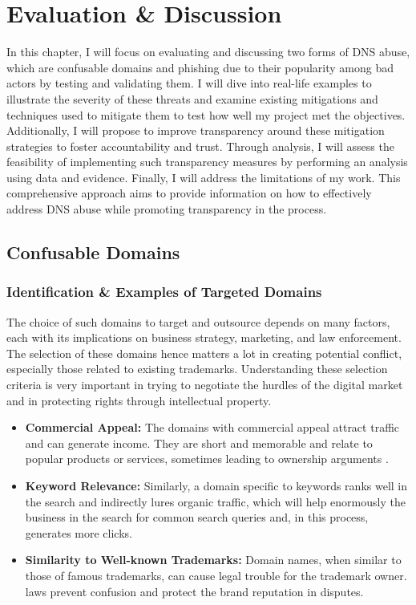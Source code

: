 \chapter{Evaluation \& Discussion}

In this chapter, I will focus on evaluating and discussing two forms of DNS abuse, which are confusable domains and phishing due to their popularity among bad actors by testing and validating them. I will dive into real-life examples to illustrate the severity of these threats and examine existing mitigations and techniques used to mitigate them to test how well my project met the objectives. Additionally, I will propose to improve transparency around these mitigation strategies to foster accountability and trust. Through analysis, I will assess the feasibility of implementing such transparency measures by performing an analysis using data and evidence. Finally, I will address the limitations of my work. This comprehensive approach aims to provide information on how to effectively address DNS abuse while promoting transparency in the process. 


\section{Confusable Domains}
\subsection{Identification \& Examples of Targeted Domains}

The choice of such domains to target and outsource depends on many factors, each with its implications on business strategy, marketing, and law enforcement. The selection of these domains hence matters a lot in creating potential conflict, especially those related to existing trademarks. Understanding these selection criteria is very important in trying to negotiate the hurdles of the digital market and in protecting rights through intellectual property.

\begin{itemize}
  \item \textbf{Commercial Appeal:} The domains with commercial appeal attract traffic and can generate income. They are short and memorable and relate to popular products or services, sometimes leading to ownership arguments \cite{Li2002ConflictDomainTrademark}.
  
  \item \textbf{Keyword Relevance:} Similarly, a domain specific to keywords ranks well in the search and indirectly lures organic traffic, which will help enormously the business in the search for common search queries and, in this process, generates more clicks.
  
  \item \textbf{Similarity to Well-known Trademarks:} Domain names, when similar to those of famous trademarks, can cause legal trouble for the trademark owner. laws prevent confusion and protect the brand reputation in disputes.
\end{itemize}

